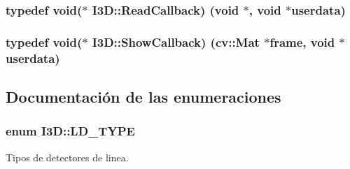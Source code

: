 \subsubsection[{\texorpdfstring{Read\+Callback}{ReadCallback}}]{\setlength{\rightskip}{0pt plus 5cm}typedef void($\ast$ I3\+D\+::\+Read\+Callback) (void $\ast$, void $\ast$userdata)}\hypertarget{namespace_i3_d_a7005f50d43ac0b10e2f50ab09994f45b}{}\label{namespace_i3_d_a7005f50d43ac0b10e2f50ab09994f45b}
\subsubsection[{\texorpdfstring{Show\+Callback}{ShowCallback}}]{\setlength{\rightskip}{0pt plus 5cm}typedef void($\ast$ I3\+D\+::\+Show\+Callback) (cv\+::\+Mat $\ast$frame, void $\ast$userdata)}\hypertarget{namespace_i3_d_a65da91c3d8b7751e061aa6d8462ea890}{}\label{namespace_i3_d_a65da91c3d8b7751e061aa6d8462ea890}


\subsection{Documentación de las enumeraciones}
\subsubsection[{\texorpdfstring{L\+D\+\_\+\+T\+Y\+PE}{LD_TYPE}}]{\setlength{\rightskip}{0pt plus 5cm}enum {\bf I3\+D\+::\+L\+D\+\_\+\+T\+Y\+PE}\hspace{0.3cm}{\ttfamily [strong]}}\hypertarget{namespace_i3_d_ac3913218d62e4e56ed38931636256ae2}{}\label{namespace_i3_d_ac3913218d62e4e56ed38931636256ae2}


Tipos de detectores de linea. 

